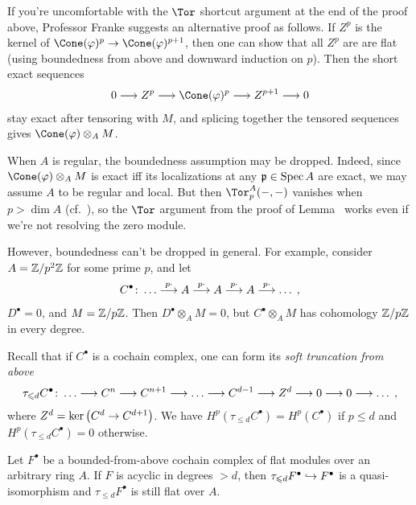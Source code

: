 \documentclass[a4paper,parskip=half,numbers=enddot, DIV=12]{scrreprt}
\renewcommand{\leq}{\leqslant}
\begin{document}
\begin{rem}
	\begin{alphanumerate}
		\item{} If you're uncomfortable with the $\Tor$ shortcut argument at the end of the proof above, Professor Franke suggests an alternative proof as follows. If $Z^p$ is the kernel of $\Cone(\phi)^p\morphism\Cone(\phi)^{p+1}$, then one can show that all $Z^p$ are are flat (using boundedness from above and downward induction on $p$). Then the short exact sequences
		\begin{align*}
			0\morphism Z^p\morphism \Cone(\phi)^p\morphism Z^{p+1}\morphism 0
		\end{align*}
		stay exact after tensoring with $M$, and splicing together the tensored sequences gives $\Cone(\phi)\otimes_AM$.
		\item When $A$ is regular, the boundedness assumption may be dropped. Indeed, since $\Cone(\phi)\otimes_AM$ is exact iff its localizations at any $\mathfrak{p}\in\operatorname{Spec} A$ are exact, we may assume $A$ to be regular and local. But then $\Tor_p^A(-,-)$ vanishes when $p>\dim A$ (cf.\ \cite[Theorem~1]{homalg}), so the $\Tor$ argument from the proof of Lemma~ works even if we're not resolving the zero module.
		
		However, boundedness can't be dropped in general. For example, consider $A=\mathbb{Z}/p^2\mathbb{Z}$ for some prime $p$, and let
		\begin{align*}
			C^\bullet\colon \ldots\morphism[ p\cdot]A\morphism[ p\cdot]A\morphism[ p\cdot]A\morphism[ p\cdot]\ldots\;,
		\end{align*}
		$D^\bullet=0$, and $M=\mathbb{Z}/p\mathbb{Z}$. Then $D^\bullet\otimes_AM=0$, but $C^\bullet\otimes_AM$ has cohomology $\mathbb{Z}/p\mathbb{Z}$ in every degree.
	\end{alphanumerate}
\end{rem}
Recall that if $C^\bullet$ is a cochain complex, one can form its \emph{soft truncation from above}
\begin{align*}
	\tau_{\leq d}C^\bullet\colon \ldots\morphism C^n\morphism C^{n+1}\morphism \ldots \morphism C^{d-1}\morphism Z^d\morphism 0\morphism 0\morphism \ldots\;,
\end{align*} 
where $Z^d=\ker\left(C^{d}\morphism C^{d+1}\right)$. We have $H^p(\tau_{\leq d}C^\bullet)=H^p(C^\bullet)$ if $p\leq d$ and $H^p(\tau_{\leq d}C^\bullet)=0$ otherwise.
\begin{lem}
	Let $F^\bullet$ be a bounded-from-above cochain complex of flat modules over an arbitrary ring $A$. If $F$ is acyclic in degrees $>d$, then $\tau_{\leq d}F^\bullet\monomorphism F^\bullet$ is a quasi-isomorphism and $\tau_{\leq d}F^\bullet$ is still flat over $A$.
\end{lem}
\end{document}
